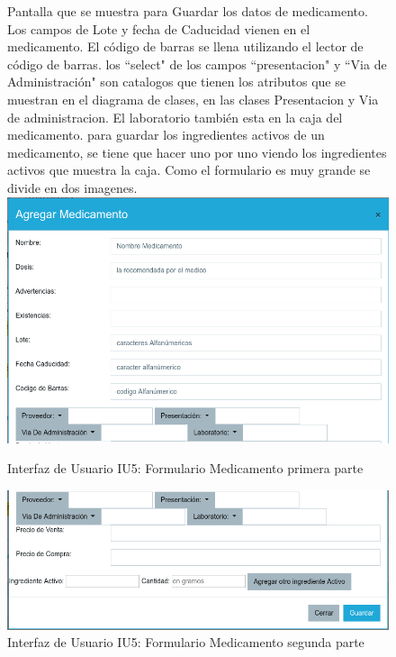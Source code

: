 \begin{figure}[htbp!]
	\begin{center}
	Pantalla que se muestra para Guardar los datos de medicamento.
	Los campos de Lote y fecha de Caducidad vienen en el medicamento.
	El código de barras se llena  utilizando el lector de código de barras.
	los ``select" de los campos ``presentacion" y ``Via de Administración" son catalogos que tienen los atributos que se muestran en el diagrama de clases, en las clases  Presentacion y Via de administracion.
	El laboratorio también esta en la caja del medicamento.
	para guardar los ingredientes activos de un medicamento, se tiene que hacer uno por uno viendo los ingredientes activos que muestra la caja.
	Como el formulario es muy grande se divide en dos imagenes.
\includegraphics[width=\textwidth]{Pantallas/FormularioMedicamento}
		\caption{Interfaz de Usuario IU5: Formulario Medicamento primera parte}
\includegraphics[width=\textwidth]{Pantallas/FormularioMedicamento2}
		\caption{Interfaz de Usuario IU5: Formulario Medicamento segunda parte}
	\end{center}

\end{figure}



